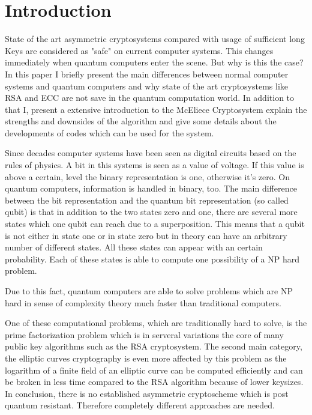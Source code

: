 \label{key}\section{Introduction}
State of the art asymmetric cryptosystems compared with usage of sufficient long Keys are considered as "safe" on current computer systems. This changes immediately when quantum computers enter the scene. But why is this the case? In this paper I briefly present the main differences between normal computer systems and quantum computers and why state of the art cryptosystems like RSA and ECC are not save in the quantum computation world. In addition to that I, present a extensive introduction to the McEliece Cryptosystem explain the strengths and downsides of the algorithm and give some details about the developments of codes which can be used for the system.

\label{conv_comp_vs_quan_comp}
Since decades computer systems have been seen as digital circuits based on the rules of physics. A bit in this systems is seen as a value of voltage. If this value is above a certain, level the binary representation is one, otherwise it's zero. 
On quantum computers, information is handled in binary, too. The main difference between the bit representation and the quantum bit representation (so called qubit) is that in addition to the two states zero and one, there are several more states which one qubit can reach due to a superposition. This means that a qubit is not either in state one or in state zero but in theory can have an arbitrary number of different states. All these states can appear with an certain probability. Each of these states is able to compute one possibility of a NP hard problem. 

Due to this fact, quantum computers are able to solve problems which are NP hard in sense of complexity theory much faster than traditional computers. 

One of these computational problems, which are traditionally hard to solve, is the prime factorization problem which is in serveral variations the core of many public key algorithms such as the RSA cryptosystem. 
The second main category, the elliptic curves cryptography is even more affected by this problem as the logarithm of a finite field of an elliptic curve can be computed efficiently and can be broken in less time compared to the RSA algorithm  because of lower keysizes. 
In conclusion, there is no established asymmetric cryptoscheme which is post quantum resistant. Therefore completely different approaches are needed. 

